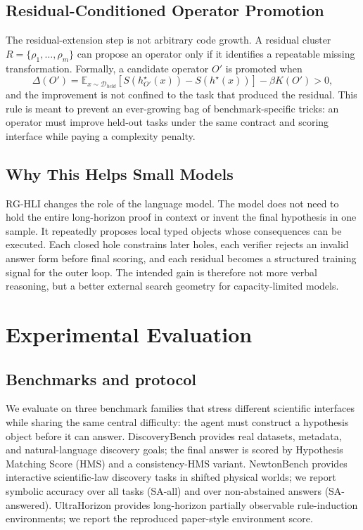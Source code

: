 \documentclass[letterpaper]{article}
\newcommand{\methodshort}{\textsc{RG-HLI}\xspace}
\begin{document}
\subsection{Residual-Conditioned Operator Promotion}

The residual-extension step is not arbitrary code growth. A residual cluster
$R=\{\rho_1,\ldots,\rho_m\}$ can propose an operator only if it identifies a
repeatable missing transformation. Formally, a candidate operator $O'$ is
promoted when
\begin{equation}
  \Delta(O') =
  \mathbb{E}_{x\sim\mathcal{D}_{held}}
  [S(h^\star_{O'}(x))-S(h^\star(x))]
  -\beta K(O') > 0,
\label{eq:promotion}
\end{equation}
and the improvement is not confined to the task that produced the residual.
This rule is meant to prevent an ever-growing bag of benchmark-specific tricks:
an operator must improve held-out tasks under the same contract and scoring
interface while paying a complexity penalty.

\subsection{Why This Helps Small Models}

\methodshort changes the role of the language model. The model does not need to hold
the entire long-horizon proof in context or invent the final hypothesis in one
sample. It repeatedly proposes local typed objects whose consequences can be
executed. Each closed hole constrains later holes, each verifier rejects an
invalid answer form before final scoring, and each residual becomes a structured
training signal for the outer loop. The intended gain is therefore not more
 verbal reasoning, but a better external search geometry for capacity-limited models.

\section{Experimental Evaluation}

\subsection{Benchmarks and protocol}

We evaluate on three benchmark families that stress different scientific
interfaces while sharing the same central difficulty: the agent must construct
a hypothesis object before it can answer. DiscoveryBench provides real
datasets, metadata, and natural-language discovery goals; the final answer is
scored by Hypothesis Matching Score (HMS) and a consistency-HMS variant.
NewtonBench provides interactive scientific-law discovery tasks in shifted
physical worlds; we report symbolic accuracy over all tasks (SA-all) and over
non-abstained answers (SA-answered). UltraHorizon provides long-horizon
partially observable rule-induction environments; we report the reproduced
paper-style environment score.
\end{document}
